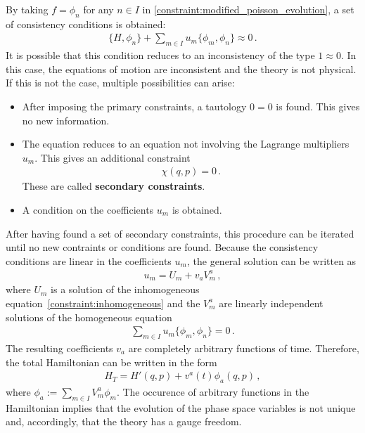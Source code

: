     \begin{property}
        By taking $f=\phi_n$ for any $n\in I$ in \cref{constraint:modified_poisson_evolution}, a set of consistency conditions is obtained:
        \begin{gather}
            \label{constraint:inhomogeneous}
            \{H,\phi_n\} + \sum_{m\in I}u_m\{\phi_m,\phi_n\}\approx 0\,.
        \end{gather}
        It is possible that this condition reduces to an inconsistency of the type $1\approx0$. In this case, the equations of motion are inconsistent and the theory is not physical. If this is not the case, multiple possibilities can arise:
        \begin{itemize}
            \item After imposing the primary constraints, a tautology $0=0$ is found. This gives no new information.
            \item The equation reduces to an equation not involving the Lagrange multipliers $u_m$. This gives an additional constraint
                \begin{gather}
                    \chi(q,p)=0\,.
                \end{gather}
                These are called \textbf{secondary constraints}.
            \item A condition on the coefficients $u_m$ is obtained.
        \end{itemize}
        After having found a set of secondary constraints, this procedure can be iterated until no new contraints or conditions are found. Because the consistency conditions are linear in the coefficients $u_m$, the general solution can be written as
        \begin{gather}
            u_m = U_m + v_aV^a _m\,,
        \end{gather}
        where $U_m$ is a solution of the inhomogeneous equation~\eqref{constraint:inhomogeneous} and the $V^a_m$ are linearly independent solutions of the homogeneous equation
        \begin{gather}
            \sum_{m\in I}u_m\{\phi_m,\phi_n\} = 0\,.
        \end{gather}
        The resulting coefficients $v_a$ are completely arbitrary functions of time. Therefore, the total Hamiltonian can be written in the form
        \begin{gather}
            H_T = H'(q,p) + v^a(t)\phi_a(q,p)\,,
        \end{gather}
        where $\phi_a := \sum_{m\in I}V^a_m\phi_m$. The occurence of arbitrary functions in the Hamiltonian implies that the evolution of the phase space variables is not unique and, accordingly, that the theory has a gauge freedom.
    \end{property}

